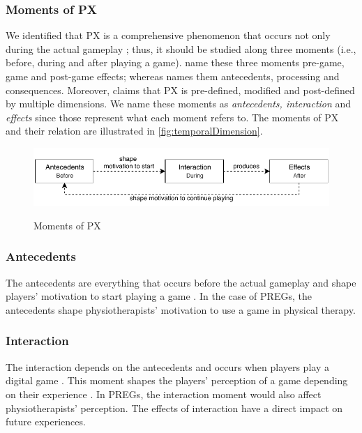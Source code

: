 \subsubsection{Moments of \ac{PX}}
We identified that \ac{PX} is a comprehensive phenomenon that occurs not only during the actual gameplay \autocite{Mayra}; thus, it should be studied along three moments \autocite{Elson2014,Fernandez2008,Nackea2,Nackea,Nacked} (i.e., before, during and after playing a game). \textcite{Elson2014} name these three moments pre-game, game and post-game effects; whereas \textcite{Fernandez2008} names them antecedents, processing and consequences. Moreover, \textcite{Mayra} claims that \ac{PX} is pre-defined, modified and post-defined by multiple dimensions. We name these moments as \textit{antecedents, interaction} and \textit{effects} since those represent what each moment refers to. The moments of \ac{PX} and their relation are illustrated in \autoref{fig:temporalDimension}.

\begin{figure}[bth]
\myfloatalign
{\includegraphics[width=.9\linewidth]{gfx/model/temporalDimension}} \quad
\caption{Moments of \ac{PX}}\label{fig:temporalDimension}
\end{figure}

\subsubsection*{Antecedents}
The antecedents are everything that occurs before the actual gameplay and shape players' motivation to start playing a game \autocite{Fernandez2008,Ferrara}. In the case of \acp{PREG}, the antecedents shape physiotherapists' motivation to use a game in physical therapy.

\subsubsection*{Interaction}
The interaction depends on the antecedents and occurs when players play a digital game \autocite{Elson2014,Fernandez2008,Nacked}. This moment shapes the players' perception of a game depending on their experience \autocite{Fernandez2008}. In \acp{PREG}, the interaction moment would also affect physiotherapists' perception. The effects of interaction have a direct impact on future experiences.


